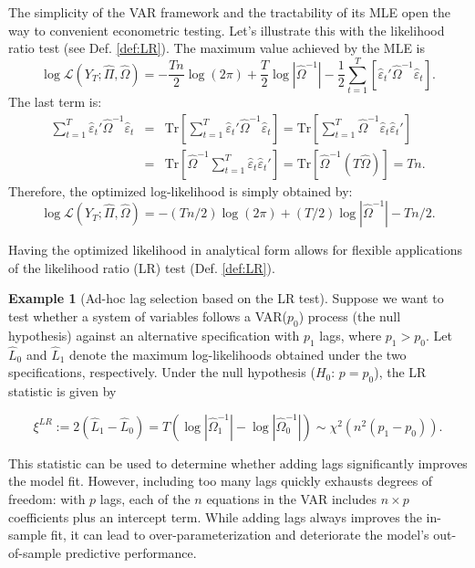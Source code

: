 \documentclass[
  11pt,
]{book}
\theoremstyle{definition}
\theoremstyle{definition}
\newtheorem{example}{Example}[chapter]
\theoremstyle{definition}
\theoremstyle{definition}
\theoremstyle{remark}
\begin{document}
The simplicity of the VAR framework and the tractability of its MLE open the way to convenient econometric testing. Let's illustrate this with the likelihood ratio test (see Def. \ref{def:LR}). The maximum value achieved by the MLE is
\[
\log\mathcal{L}(Y_{T};\hat{\Pi},\hat{\Omega}) = -\frac{Tn}{2}\log(2\pi)+\frac{T}{2}\log\left|\hat{\Omega}^{-1}\right| -\frac{1}{2}\sum_{t=1}^{T}\left[\hat{\varepsilon}_{t}'\hat{\Omega}^{-1}\hat{\varepsilon}_{t}\right].
\]
The last term is:
\begin{eqnarray*}
\sum_{t=1}^{T}\hat{\varepsilon}_{t}'\hat{\Omega}^{-1}\hat{\varepsilon}_{t} &=& \mbox{Tr}\left[\sum_{t=1}^{T}\hat{\varepsilon}_{t}'\hat{\Omega}^{-1}\hat{\varepsilon}_{t}\right] = \mbox{Tr}\left[\sum_{t=1}^{T}\hat{\Omega}^{-1}\hat{\varepsilon}_{t}\hat{\varepsilon}_{t}'\right]\\
&=&\mbox{Tr}\left[\hat{\Omega}^{-1}\sum_{t=1}^{T}\hat{\varepsilon}_{t}\hat{\varepsilon}_{t}'\right] = \mbox{Tr}\left[\hat{\Omega}^{-1}\left(T\hat{\Omega}\right)\right]=Tn.
\end{eqnarray*}
Therefore, the optimized log-likelihood is simply obtained by:
\begin{equation}
\log\mathcal{L}(Y_{T};\hat{\Pi},\hat{\Omega})=-(Tn/2)\log(2\pi)+(T/2)\log\left|\hat{\Omega}^{-1}\right|-Tn/2.
\label{eq:optimzedLogL}
\end{equation}

Having the optimized likelihood in analytical form allows for flexible applications of the likelihood ratio (LR) test (Def. \ref{def:LR}).

\begin{example}[Ad-hoc lag selection based on the LR test]
\protect\hypertarget{exm:AdhocLagSelectLR}{}\label{exm:AdhocLagSelectLR}Suppose we want to test whether a system of variables follows a VAR(\(p_0\)) process (the null hypothesis) against an alternative specification with \(p_1\) lags, where \(p_1 > p_0\).
Let \(\hat{L}_0\) and \(\hat{L}_1\) denote the maximum log-likelihoods obtained under the two specifications, respectively.
Under the null hypothesis (\(H_0\): \(p = p_0\)), the LR statistic is given by

\begin{equation}
\xi^{LR} := 2(\hat{L}_1 - \hat{L}_0)
= T \left( \log\left|\hat{\Omega}_1^{-1}\right| - \log\left|\hat{\Omega}_0^{-1}\right| \right)
\sim \chi^2\left(n^2(p_1 - p_0)\right).
\end{equation}

This statistic can be used to determine whether adding lags significantly improves the model fit.
However, including too many lags quickly exhausts degrees of freedom: with \(p\) lags, each of the \(n\) equations in the VAR includes \(n \times p\) coefficients plus an intercept term.
While adding lags always improves the in-sample fit, it can lead to over-parameterization and deteriorate the model's out-of-sample predictive performance.
\end{example}
\end{document}
